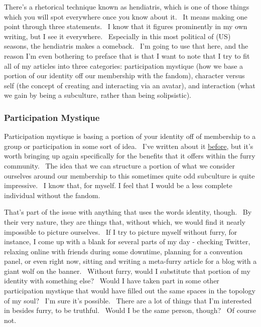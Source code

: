 There's a rhetorical technique known as hendiatris, which is one of
those things which you will spot everywhere once you know about it. ~It
means making one point through three statements. ~I know that it figures
prominently in my own writing, but I see it everywhere. ~Especially in
this most political of (US) seasons, the hendiatris makes a comeback.
~I'm going to use that here, and the reason I'm even bothering to
preface that is that I want to note that I try to fit all of my articles
into three categories: participation mystique (how we base a portion of
our identity off our membership with the fandom), character versus self
(the concept of creating and interacting via an avatar), and interaction
(what we gain by being a subculture, rather than being solipsistic).

\subsubsection{Participation Mystique}\label{participation-mystique}

Participation mystique is basing a portion of your identity off of
membership to a group or participation in some sort of idea. ~I've
written about it
\href{http://adjectivespecies.com/2012/01/25/participation-mystique/}{before},
but it's worth bringing up again specifically for the benefits that it
offers within the furry community. ~The idea that we can structure a
portion of what we consider ourselves around our membership to this
sometimes quite odd subculture is quite impressive. ~I know that, for
myself. I feel that I would be a less complete individual without the
fandom.

That's part of the issue with anything that uses the words identity,
though. ~By their very nature, they are things that, without which, we
would find it nearly impossible to picture ourselves. ~If I try to
picture myself without furry, for instance, I come up with a blank for
several parts of my day - checking Twitter, relaxing online with friends
during some downtime, planning for a convention panel, or even right
now, sitting and writing a meta-furry article for a blog with a giant
wolf on the banner. ~Without furry, would I substitute that portion of
my identity with something else? ~Would I have taken part in some other
participation mystique that would have filled out the same spaces in the
topology of my soul? ~I'm sure it's possible. ~There are a lot of things
that I'm interested in besides furry, to be truthful. ~Would I be the
same person, though? ~Of course not.

